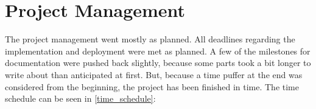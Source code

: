 \chapter{Project Management}


The project management went mostly as planned.
All deadlines regarding the implementation and deployment were met as planned.
A few of the milestones for documentation were pushed back slightly, because some parts took a bit longer to write about than anticipated at first.
But, because a time puffer at the end was considered from the beginning, the project has been finished in time.
The time schedule can be seen in \autoref{time_schedule}:



